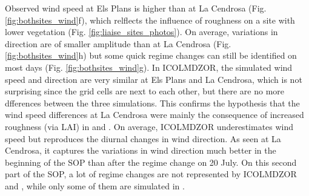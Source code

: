 Observed wind speed at Els Plans is higher than at La Cendrosa (Fig. \ref{fig:bothsites_wind}f), which relflects the influence of roughness on a site with lower vegetation (Fig. \ref{fig:liaise_sites_photos}). On average, variations in direction are of smaller amplitude than at La Cendrosa (Fig. \ref{fig:bothsites_wind}h) but some quick regime changes can still be identified on most days (Fig. \ref{fig:bothsites_wind}g).
In ICOLMDZOR, the simulated wind speed and direction are very similar at Els Plans and La Cendrosa, which is not surprising since the grid cells are next to each other, but there are no more dfferences between the three simulations. This confirms the hypothesis that the wind speed differences at La Cendrosa were mainly the consequence of increased roughness (via LAI) in \irrboost and \irr. On average, ICOLMDZOR underestimates wind speed but reproduces the diurnal changes in wind direction. As seen at La Cendrosa, it captures the variations in wind direction much better in the beginning of the SOP than after the regime change on 20 July. On this second part of the SOP, a lot of regime changes are not represented by ICOLMDZOR and \mesomean, while only some of them are simulated in \mesoexact.

